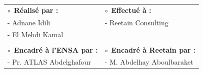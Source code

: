\documentclass[12pt,a4paper]{report}
\newcommand{\circularbullet}{\textcolor{coverblue}{$\circ$}}
\begin{document}
\begin{titlepage}
\begin{center}
    \begin{center}
    \end{center}
    \vspace{0.8cm}
    
    \begin{center}
        \begin{tabular}{p{}p{}}
            \hspace*{0pt}\circularbullet~\textbf{\textcolor{coverblue}{Réalisé par :}} & \hspace*{0pt}\circularbullet~\textbf{\textcolor{coverblue}{Effectué à :}} \\
            \hspace{4em}-\hspace*{0.5em} Adnane Idili & \hspace{4em}-\hspace*{0.5em} Reetain Consulting \\
            \hspace{4em}-\hspace*{0.5em} El Mehdi Kamal & \\
            & \\
            \hspace*{0pt}\circularbullet~\textbf{\textcolor{coverblue}{Encadré à l'ENSA par :}} & \hspace*{0pt}\circularbullet~\textbf{\textcolor{coverblue}{Encadré à Reetain par :}} \\
            \hspace{4em}-\hspace*{0.5em} Pr. ATLAS Abdelghafour & \hspace{4em}-\hspace*{0.5em} M. Abdelhay Aboulbaraket \\
        \end{tabular}
    \end{center}
    \vspace{1cm}
    

\end{center}
\end{titlepage}
\end{document}
